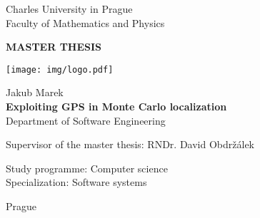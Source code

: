 \begin{titlingpage}
\begin{center}

\vspace{15mm}

\large
Charles University in Prague\\
Faculty of Mathematics and Physics\\

\vspace{10mm}

{\Large\textbf{MASTER THESIS}}

\vspace{20mm}

\texttt{[image: img/logo.pdf]} 

\vspace{20mm}

{\Large Jakub Marek}\\
\vspace{5mm}
{\Large\textbf{Exploiting GPS in Monte Carlo localization}}\\
\vspace{5mm}
Department of Software Engineering\\
\vspace{20mm}

\large
\noindent Supervisor of the master thesis: RNDr. David Obdržálek
\vspace{1mm} 

\noindent Study programme: Computer science \\
Specialization: Software systems

\vspace{20mm}

Prague \the\year
\end{center}

\end{titlingpage}

\movetooddpage

